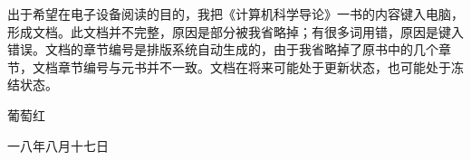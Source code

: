 
出于希望在电子设备阅读的目的，我把《计算机科学导论》一书的内容键入电脑，形成文档。此文档并不完整，原因是部分被我省略掉；有很多词用错，原因是键入错误。文档的章节编号是排版系统自动生成的，由于我省略掉了原书中的几个章节，文档章节编号与元书并不一致。文档在将来可能处于更新状态，也可能处于冻结状态。 \par
\begin{flushright}
葡萄红 \par
一八年八月十七日
\end{flushright}
